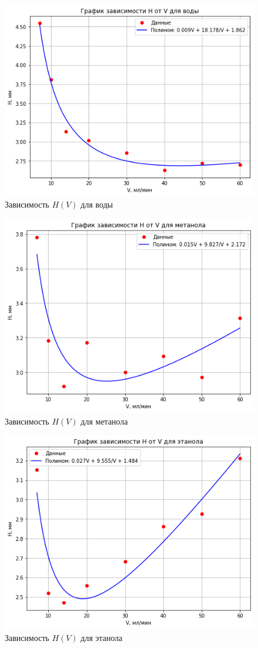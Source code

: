 \documentclass{article}
\begin{document}
\begin{figure}[h]
    \centering
    \includegraphics[width=0.75\linewidth]{Images/vd1.png}
    \caption{Зависимость $H(V)$ для воды }
    \label{fig:vd1}
\end{figure}
\begin{figure}[h]
    \centering
    \includegraphics[width=0.75\linewidth]{Images/vd2.png}
    \caption{Зависимость $H(V)$ для метанола }
    \label{fig:vd2}
\end{figure}
\begin{figure}[h]
    \centering
    \includegraphics[width=0.75\linewidth]{Images/vd3.png}
    \caption{Зависимость $H(V)$ для этанола}
    \label{fig:vd3}
\end{figure}
\end{document}
